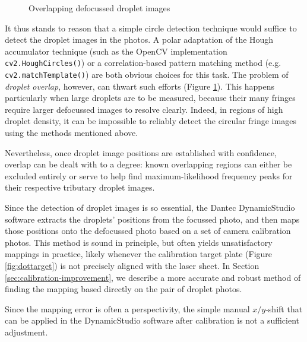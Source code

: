\documentclass[10pt]{book}
\begin{document}
\begin{figure}
\centering
\caption{Overlapping defocussed droplet images}
\label{fig:droplet-overlap}
\end{figure}

It thus stands to reason that a simple circle detection technique would suffice
to detect the droplet images in the photos. A polar adaptation of the Hough
accumulator technique (such as the OpenCV implementation
\texttt{cv2.HoughCircles()}) or a correlation-based pattern matching method
(e.g. \texttt{cv2.matchTemplate()}) are both obvious choices for this task.  The
problem of \emph{droplet overlap}, however, can thwart such efforts (Figure
\ref{fig:droplet-overlap}). This happens particularly when large droplets are to
be measured, because their many fringes require larger defocussed images to
resolve clearly. Indeed, in regions of high droplet density, it can be impossible
to reliably detect the circular fringe images using the methods mentioned above.

Nevertheless, once droplet image positions are established with confidence, overlap can be
dealt with to a degree: known overlapping regions can either be excluded
entirely or serve to help find maximum-likelihood frequency peaks for their
respective tributary droplet images.

Since the detection of droplet images is so essential, the Dantec DynamicStudio
software extracts the droplets' positions from the focussed photo, and then maps
those positions onto the defocussed photo based on a set of camera calibration
photos. This method is sound in principle, but often yields unsatisfactory
mappings in practice, likely whenever the calibration target plate (Figure
\ref{fig:dottarget}) is not precisely aligned with the laser sheet. In Section
\ref{sec:calibration-improvement}, we describe a more accurate and robust method
of finding the mapping based directly on the pair of droplet photos. 

Since the mapping error is often a perspectivity, the simple manual
$x/y$-shift that can be applied in the DynamicStudio software after calibration
is not a sufficient adjustment.
\end{document}
